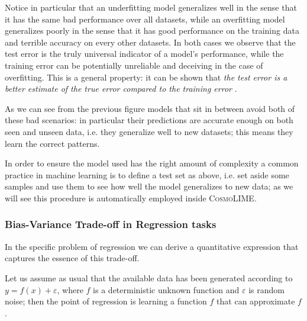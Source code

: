 Notice in particular that an underfitting model generalizes well in the sense that it has the same bad performance over all datasets, while an overfitting model generalizes poorly in the sense that it has good performance on the training data and terrible accuracy on every other datasets.
In both cases we observe that the test error is the truly universal indicator of a model's performance, while the training error can be potentially unreliable and deceiving in the case of overfitting.
This is a general property: it can be shown that \emph{the test error is a better estimate of the true error compared to the training error} \cite{understanding_ml}.

As we can see from the previous figure models that sit in between avoid both of these bad scenarios: in particular their predictions are accurate enough on both seen and unseen data, i.e. they generalize well to new datasets; this means they learn the correct patterns.

In order to ensure the model used has the right amount of complexity a common practice in machine learning is to define a test set as above, i.e. set aside some samples and use them to see how well the model generalizes to new data; as we will see this procedure is automatically employed inside \textsc{CosmoLIME}.

\subsubsection{Bias-Variance Trade-off in Regression tasks}
In the specific problem of regression we can derive a quantitative expression that captures the essence of this trade-off.

Let us assume as usual that the available data has been generated according to $y=f(x)+\varepsilon$, where $f$ is a deterministic unknown function and $\varepsilon$ is random noise; then the point of regression is learning a function $\hat{f}$ that can approximate $f$.

